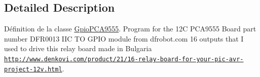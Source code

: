 \subsection{Detailed Description}
Définition de la classe \hyperlink{classGpioPCA9555}{Gpio\+P\+C\+A9555}. Program for the 12C P\+C\+A9555 Board part number D\+F\+R0013 I\+IC TO G\+P\+IO module from dfrobot.\+com 16 outputs that I used to drive this relay board made in Bulgaria \href{http://www.denkovi.com/product/21/16-relay-board-for-your-pic-avr-project-12v.html}{\tt http\+://www.\+denkovi.\+com/product/21/16-\/relay-\/board-\/for-\/your-\/pic-\/avr-\/project-\/12v.\+html}. 


